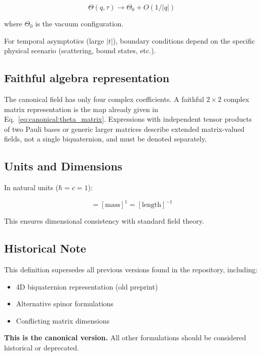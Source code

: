\begin{equation}
\label{eq:canonical:theta_asymptotics}
\Theta(q,\tau) \to \Theta_0 + O(1/|q|)
\end{equation}

\noindent where $\Theta_0$ is the vacuum configuration.

For temporal asymptotics (large $|t|$), boundary conditions depend on the specific physical scenario (scattering, bound states, etc.).

\subsection{Faithful algebra representation}

The canonical field has only four complex coefficients. A faithful
$2\times2$ complex matrix representation is the map already given in
Eq.~\eqref{eq:canonical:theta_matrix}. Expressions with independent tensor
products of two Pauli bases or generic larger matrices describe extended
matrix-valued fields, not a single biquaternion, and must be denoted
separately.

\subsection{Units and Dimensions}

In natural units ($\hbar = c = 1$):

\begin{equation}
[\Theta] = [\text{mass}]^1 = [\text{length}]^{-1}
\end{equation}

This ensures dimensional consistency with standard field theory.

\subsection{Historical Note}

This definition supersedes all previous versions found in the repository, including:
\begin{itemize}
    \item 4D biquaternion representation (old preprint)
    \item Alternative spinor formulations
    \item Conflicting matrix dimensions
\end{itemize}

\textbf{This is the canonical version.} All other formulations should be considered historical or deprecated.


